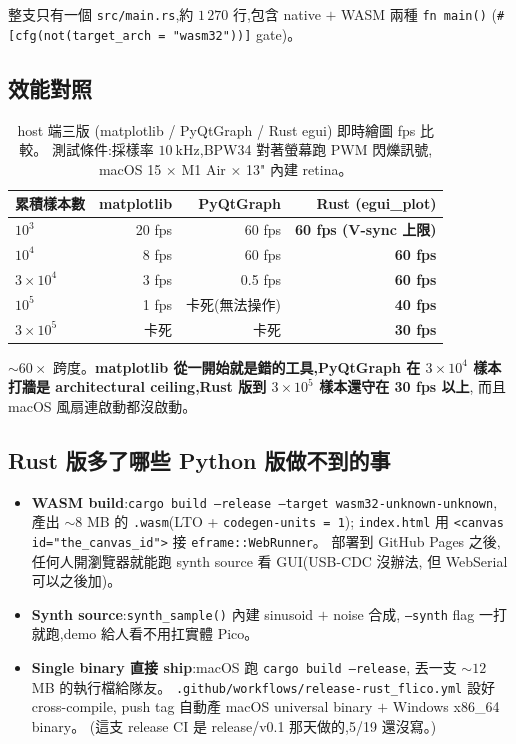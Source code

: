 整支只有一個 \texttt{src/main.rs},約 \(1\,270\) 行,包含 native \(+\) WASM 兩種 \texttt{fn main()}
(\texttt{\#[cfg(not(target\_arch = "wasm32"))]} gate)。

\subsection*{效能對照}

\begin{table}[H]
  \centering
  \caption{host 端三版 (matplotlib / PyQtGraph / Rust egui) 即時繪圖 fps 比較。
           測試條件:採樣率 \(\SI{10}{\kilo\hertz}\),BPW34 對著螢幕跑 PWM 閃爍訊號,
           macOS 15 \(\times\) M1 Air \(\times\) 13" 內建 retina。}
  \label{tab:0519-perf}
  \begin{tabular}{lrrr}
    \toprule
    累積樣本數 & matplotlib & PyQtGraph & \textbf{Rust (egui\_plot)} \\
    \midrule
    \(10^3\)         & 20  fps & 60 fps & \textbf{60 fps (V-sync 上限)} \\
    \(10^4\)         & 8  fps  & 60 fps & \textbf{60 fps} \\
    \(3 \times 10^4\)& 3  fps  & 0.5 fps & \textbf{60 fps} \\
    \(10^5\)         & 1  fps  & 卡死(無法操作)& \textbf{40 fps} \\
    \(3 \times 10^5\)& 卡死    & 卡死             & \textbf{30 fps} \\
    \bottomrule
  \end{tabular}
\end{table}

\(\sim 60 \times\) 跨度。\textbf{matplotlib 從一開始就是錯的工具,PyQtGraph 在 \(3 \times 10^4\) 樣本
打牆是 architectural ceiling,Rust 版到 \(3 \times 10^5\) 樣本還守在 30 fps 以上},
而且 macOS 風扇連啟動都沒啟動。

\subsection*{Rust 版多了哪些 Python 版做不到的事}

\begin{itemize}[leftmargin=2em,itemsep=0pt]
  \item \textbf{WASM build}:\texttt{cargo build --release --target wasm32-unknown-unknown},
        產出 \(\sim 8\) MB 的 \texttt{.wasm}(LTO + \texttt{codegen-units = 1});
        \texttt{index.html} 用 \texttt{<canvas id="the\_canvas\_id">} 接 \texttt{eframe::WebRunner}。
        部署到 GitHub Pages 之後,任何人開瀏覽器就能跑 synth source 看 GUI(USB-CDC 沒辦法,
        但 WebSerial 可以之後加)。
  \item \textbf{Synth source}:\texttt{synth\_sample()} 內建 sinusoid \(+\) noise 合成,
        \texttt{--synth} flag 一打就跑,demo 給人看不用扛實體 Pico。
  \item \textbf{Single binary 直接 ship}:macOS 跑 \texttt{cargo build --release},
        丟一支 \(\sim 12\) MB 的執行檔給隊友。
        \texttt{.github/workflows/release-rust\_flico.yml} 設好 cross-compile,
        push tag 自動產 macOS universal binary \(+\) Windows x86\_64 binary。
        (這支 release CI 是 release/v0.1 那天做的,5/19 還沒寫。)
\end{itemize}

